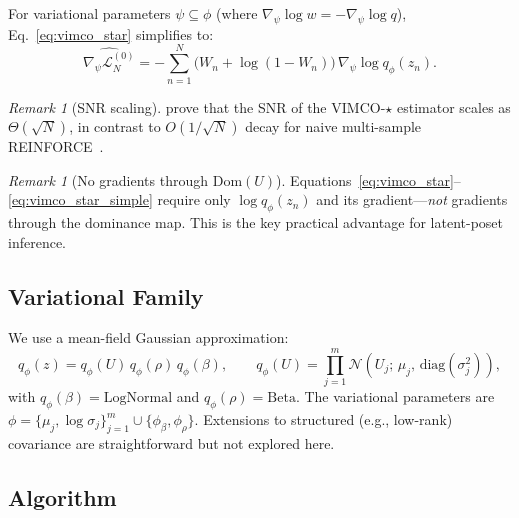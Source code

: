 \documentclass{article}
\theoremstyle{definition}
\theoremstyle{remark}
\newtheorem{remark}[theorem]{Remark}
\newcommand{\Dom}{\mathrm{Dom}}
\begin{document}
For variational parameters $\psi\subseteq\phi$
(where $\nabla_\psi\log w=-\nabla_\psi\log q$),
Eq.~\eqref{eq:vimco_star} simplifies to:
\begin{equation}
\widehat{\nabla_\psi\mathcal{L}^{(0)}_N}
= -\sum_{n=1}^N
\bigl(W_n+\log(1-W_n)\bigr)\,\nabla_\psi\log q_\phi(z_n).
\label{eq:vimco_star_simple}
\end{equation}

\begin{remark}[SNR scaling]
\citet{daudel2026importance} prove that the SNR of the
VIMCO-$\star$ estimator scales as $\Theta(\sqrt{N})$, in contrast to
$O(1/\sqrt{N})$ decay for naive multi-sample
REINFORCE~\citep{williams1992reinforce}.
\end{remark}

\begin{remark}[No gradients through $\Dom(U)$]
\label{rem:no_grad}
Equations~\eqref{eq:vimco_star}--\eqref{eq:vimco_star_simple} require only
$\log q_\phi(z_n)$ and its gradient---\emph{not} gradients through the
dominance map.
This is the key practical advantage for latent-poset inference.
\end{remark}

\subsection{Variational Family}
\label{sec:var_family}
We use a mean-field Gaussian approximation:
\begin{equation}
q_\phi(z) = q_\phi(U)\,q_\phi(\rho)\,q_\phi(\beta),
\qquad
q_\phi(U) = \prod_{j=1}^m \mathcal{N}(U_j;\,\mu_j,\,\mathrm{diag}(\sigma_j^2)),
\label{eq:var_family}
\end{equation}
with $q_\phi(\beta)=\mathrm{LogNormal}$ and $q_\phi(\rho)=\mathrm{Beta}$.
The variational parameters are
$\phi=\{\mu_j,\log\sigma_j\}_{j=1}^m\cup\{\phi_\beta,\phi_\rho\}$.
Extensions to structured (e.g., low-rank) covariance are straightforward
but not explored here.

\subsection{Algorithm}
\end{document}
